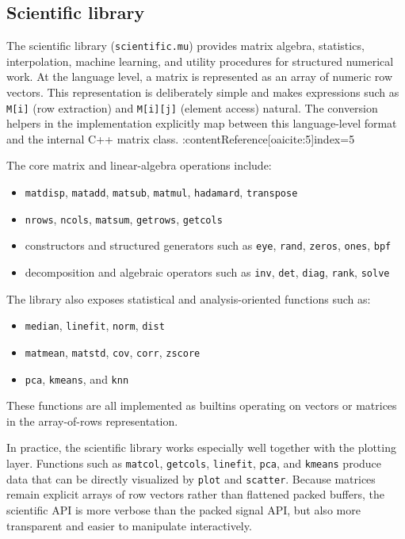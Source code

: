 \documentclass[11pt,a4paper]{article}
\newcommand{\musil}[1]{\lstinline[style=musilinline]{#1}}
\begin{document}
\subsection{Scientific library}

The scientific library (\musil{scientific.mu}) provides matrix algebra, statistics, interpolation, machine learning, and utility procedures for structured numerical work. At the language level, a matrix is represented as an array of numeric row vectors. This representation is deliberately simple and makes expressions such as \texttt{M[i]} (row extraction) and \texttt{M[i][j]} (element access) natural. The conversion helpers in the implementation explicitly map between this language-level format and the internal C++ matrix class. :contentReference[oaicite:5]{index=5}

The core matrix and linear-algebra operations include:
\begin{itemize}
    \item \texttt{matdisp}, \texttt{matadd}, \texttt{matsub}, \texttt{matmul}, \texttt{hadamard}, \texttt{transpose}
    \item \texttt{nrows}, \texttt{ncols}, \texttt{matsum}, \texttt{getrows}, \texttt{getcols}
    \item constructors and structured generators such as \texttt{eye}, \texttt{rand}, \texttt{zeros}, \texttt{ones}, \texttt{bpf}
    \item decomposition and algebraic operators such as \texttt{inv}, \texttt{det}, \texttt{diag}, \texttt{rank}, \texttt{solve}
\end{itemize}
The library also exposes statistical and analysis-oriented functions such as:
\begin{itemize}
    \item \texttt{median}, \texttt{linefit}, \texttt{norm}, \texttt{dist}
    \item \texttt{matmean}, \texttt{matstd}, \texttt{cov}, \texttt{corr}, \texttt{zscore}
    \item \texttt{pca}, \texttt{kmeans}, and \texttt{knn}
\end{itemize}
These functions are all implemented as builtins operating on vectors or matrices in the array-of-rows representation. 

In practice, the scientific library works especially well together with the plotting layer. Functions such as \texttt{matcol}, \texttt{getcols}, \texttt{linefit}, \texttt{pca}, and \texttt{kmeans} produce data that can be directly visualized by \texttt{plot} and \texttt{scatter}. Because matrices remain explicit arrays of row vectors rather than flattened packed buffers, the scientific API is more verbose than the packed signal API, but also more transparent and easier to manipulate interactively. 
\end{document}
